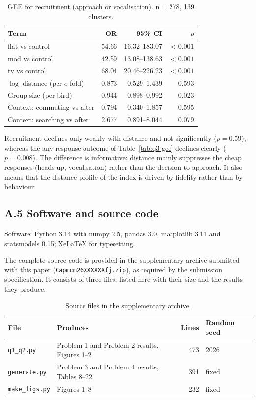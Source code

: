 \begin{table}[htbp]
  \centering
  \caption{GEE for recruitment (approach or vocalisation). n = 278, 139 clusters.}\label{tab:gee-recruit}
  \small
  \begin{tabular}{lrrr}
    \toprule
    Term & OR & 95\% CI & $p$ \\
    \midrule
    flat vs control & 54.66 & 16.32--183.07 & $<0.001$ \\
    mod vs control & 42.59 & 13.08--138.63 & $<0.001$ \\
    tv vs control & 68.04 & 20.46--226.23 & $<0.001$ \\
    $\log$ distance (per $e$-fold) & 0.873 & 0.529--1.439 & 0.593 \\
    Group size (per bird) & 0.944 & 0.898--0.992 & 0.023 \\
    Context: commuting vs after & 0.794 & 0.340--1.857 & 0.595 \\
    Context: searching vs after & 2.677 & 0.891--8.044 & 0.079 \\
    \bottomrule
  \end{tabular}
\end{table}

Recruitment declines only weakly with distance and not significantly ($p=0.59$), whereas the
any-response outcome of Table~\ref{tab:q3-gee} declines clearly ($p=0.008$). The difference is
informative: distance mainly suppresses the cheap responses (heads-up, vocalisation) rather than
the decision to approach. It also means that the distance profile of the index is driven by
fidelity rather than by behaviour.

\subsection*{A.5 Software and source code}

Software: Python 3.14 with numpy 2.5, pandas 3.0, matplotlib 3.11 and statsmodels 0.15;
XeLaTeX for typesetting.

The complete source code is provided in the supplementary archive submitted with this paper
(\texttt{Capmcm26XXXXXXfj.zip}), as required by the submission specification. It consists of
three files, listed here with their size and the results they produce.

\begin{table}[htbp]
  \centering
  \caption{Source files in the supplementary archive.}\label{tab:code}
  \small
  \begin{tabular}{llrl}
    \toprule
    File & Produces & Lines & Random seed \\
    \midrule
    \texttt{q1\_q2.py} & Problem 1 and Problem 2 results, Figures 1--2 & 473 & 2026 \\
    \texttt{generate.py} & Problem 3 and Problem 4 results, Tables 8--22 & 391 & fixed \\
    \texttt{make\_figs.py} & Figures 1--8 & 232 & fixed \\
    \bottomrule
  \end{tabular}
\end{table}


